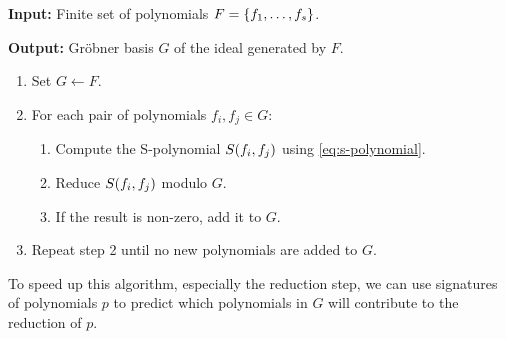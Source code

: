 \documentclass[twoside]{article}
\begin{document}
\textbf{Input:} Finite set of polynomials \(F = \{f_1, \ldots, f_s\}\).

\textbf{Output:} Gr\"{o}bner basis \(G\) of the ideal generated by \(F\).

\begin{enumerate}
    \item Set \(G \gets F\).
    \item For each pair of polynomials \(f_i, f_j \in G\):
    \begin{enumerate}
        \item Compute the S-polynomial \(S(f_i, f_j)\) using
        \eqref{eq:s-polynomial}.
        \item Reduce \(S(f_i, f_j)\) modulo \(G\).
        \item If the result is non-zero, add it to \(G\).
    \end{enumerate}
    \item Repeat step 2 until no new polynomials are added to \(G\).
\end{enumerate}

To speed up this algorithm, especially the reduction step, we can use signatures
of polynomials \(p\) to predict which polynomials in \(G\) will contribute to
the reduction of \(p\).
\end{document}

